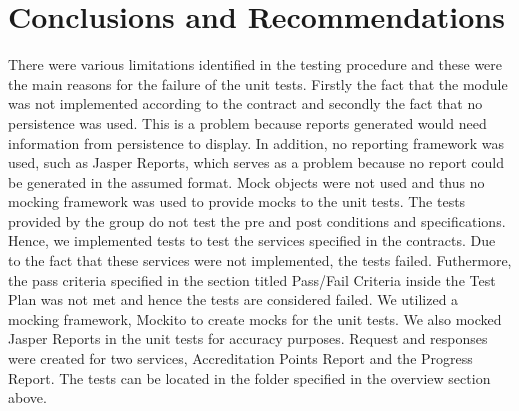 \section{Conclusions and Recommendations}
\label{sec:conclusions}
There were various limitations identified in the testing procedure and these were the main reasons for the failure of the unit tests. Firstly the fact that the module was not implemented according to the contract and secondly the fact that no persistence was used. This is a problem because reports generated would need information from persistence to display. In addition, no reporting framework was used, such as Jasper Reports, which serves as a problem because no report could be generated in the assumed format. Mock objects were not used and thus no mocking framework was used to provide mocks to the unit tests. The tests provided by the group do not test the pre and post conditions and specifications. Hence, we implemented tests to test the services specified in the contracts. Due to the fact that these services were not implemented, the tests failed. Futhermore, the pass criteria specified in the section titled Pass/Fail Criteria inside the Test Plan was not met and hence the tests are considered failed. We utilized a mocking framework, Mockito to create mocks for the unit tests. We also mocked Jasper Reports in the unit tests for accuracy purposes. Request and responses were created for two services, Accreditation Points Report and the Progress Report. The tests can be located in the folder specified in the overview section above.
